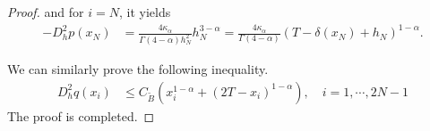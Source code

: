 \documentclass{amsart}
\theoremstyle{definition}
\theoremstyle{remark}
\numberwithin{equation}{section}
\begin{document}
\begin{proof}
  and for $i=N$, it yields
  \begin{equation*}
    \begin{aligned}
      -D_h^2 p(x_N) 
          & = \frac{4 \kappa_\alpha}{\Gamma(4-\alpha) h_N^2} h_N^{3-\alpha}
          = \frac{4 \kappa_\alpha}{\Gamma(4-\alpha)} (T - \delta(x_N)+h_N)^{1-\alpha} .
    \end{aligned}
  \end{equation*}


  We can similarly prove the following inequality.
  \begin{equation*}
    \begin{aligned}
      D_h^2 q(x_i) 
          & \le C_{\tilde{B}}  (x_{i}^{1-\alpha} + (2T-x_{i})^{1-\alpha}), \quad i=1,\cdots, 2N-1 
    \end{aligned}
  \end{equation*}
  The proof is completed.
\end{proof}
\end{document}
